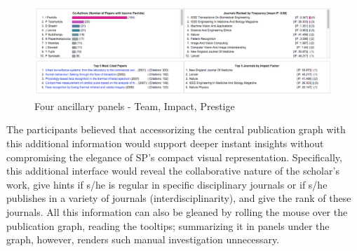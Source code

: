  \begin{figure}[h]
  \centering
  \includegraphics[width=\columnwidth]{figures/fig-panels}
  \caption{Four ancillary panels - Team, Impact, Prestige}
  \label{fig:panels} 
\end{figure}

The participants believed that accessorizing the central publication graph with this additional information would support deeper instant insights without compromising the elegance of SP's compact visual representation. Specifically, this additional interface would reveal the collaborative nature of the scholar's work, give hints if s/he is regular in specific disciplinary journals or if s/he publishes in a variety of journals (interdisciplinarity), and give the rank of these journals. All this information can also be gleaned by rolling the mouse over the publication graph, reading the tooltips; summarizing it in panels under the graph, however, renders such manual investigation unnecessary.